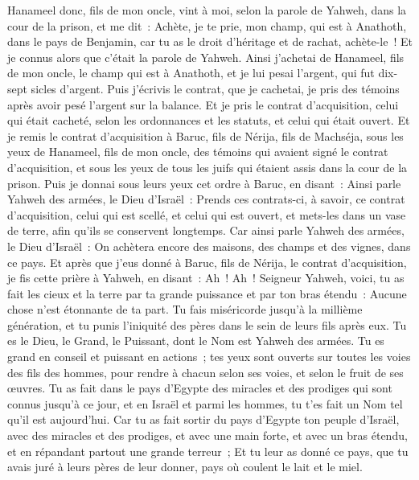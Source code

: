 \begin{multicols}{2}
Hanameel donc, fils de mon oncle, vint à moi, selon la parole de Yahweh, dans la cour de la prison, et me dit~: Achète, je te prie, mon champ, qui est à Anathoth, dans le pays de Benjamin, car tu as le droit d'héritage et de rachat, achète-le~! Et je connus alors que c'était la parole de Yahweh.
Ainsi j'achetai de Hanameel, fils de mon oncle, le champ qui est à Anathoth, et je lui pesai l'argent, qui fut dix-sept sicles d'argent.
Puis j'écrivis le contrat, que je cachetai, je pris des témoins après avoir pesé l'argent sur la balance.
Et je pris le contrat d'acquisition, celui qui était cacheté, selon les ordonnances et les statuts, et celui qui était ouvert.
Et je remis le contrat d'acquisition à Baruc, fils de Nérija, fils de Machséja, sous les yeux de Hanameel, fils de mon oncle, des témoins qui avaient signé le contrat d'acquisition, et sous les yeux de tous les juifs qui étaient assis dans la cour de la prison.
Puis je donnai sous leurs yeux cet ordre à Baruc, en disant~:
Ainsi parle Yahweh des armées, le Dieu d'Israël~: Prends ces contrats-ci, à savoir, ce contrat d'acquisition, celui qui est scellé, et celui qui est ouvert, et mets-les dans un vase de terre, afin qu'ils se conservent longtemps.
Car ainsi parle Yahweh des armées, le Dieu d'Israël~: On achètera encore des maisons, des champs et des vignes, dans ce pays.
Et après que j'eus donné à Baruc, fils de Nérija, le contrat d'acquisition, je fis cette prière à Yahweh, en disant~:
Ah~! Ah~! Seigneur Yahweh, voici, tu as fait les cieux et la terre par ta grande puissance et par ton bras étendu~: Aucune chose n'est étonnante de ta part.
Tu fais miséricorde jusqu'à la millième génération, et tu punis l'iniquité des pères dans le sein de leurs fils après eux. Tu es le Dieu, le Grand, le Puissant, dont le Nom est Yahweh des armées.
Tu es grand en conseil et puissant en actions~; tes yeux sont ouverts sur toutes les voies des fils des hommes, pour rendre à chacun selon ses voies, et selon le fruit de ses œuvres.
Tu as fait dans le pays d'Egypte des miracles et des prodiges qui sont connus jusqu'à ce jour, et en Israël et parmi les hommes, tu t'es fait un Nom tel qu'il est aujourd'hui.
Car tu as fait sortir du pays d'Egypte ton peuple d'Israël, avec des miracles et des prodiges, et avec une main forte, et avec un bras étendu, et en répandant partout une grande terreur~;
Et tu leur as donné ce pays, que tu avais juré à leurs pères de leur donner, pays où coulent le lait et le miel.

\end{multicols}
